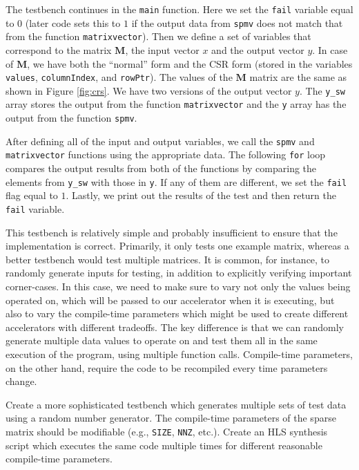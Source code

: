 The testbench continues in the \lstinline{main} function. Here we set the \lstinline{fail} variable equal to $0$ (later code sets this to $1$ if the output data from \lstinline{spmv} does not match that from the function \lstinline{matrixvector}). Then we define a set of variables that correspond to the matrix $\mathbf{M}$, the input vector $x$ and the output vector $y$. In case of $\mathbf{M}$, we have both the ``normal'' form and the CSR form (stored in the variables \lstinline{values}, \lstinline{columnIndex}, and \lstinline{rowPtr}). The values of the $\mathbf{M}$ matrix are the same as shown in Figure \ref{fig:crs}. We have two versions of the output vector $y$. The \lstinline{y_sw} array stores the output from the function \lstinline{matrixvector} and the \lstinline{y} array has the output from the function \lstinline{spmv}. 

After defining all of the input and output variables, we call the \lstinline{spmv} and \lstinline{matrixvector} functions using the appropriate data. The following \lstinline{for} loop compares the output results from both of the functions by comparing the elements from \lstinline{y_sw} with those in \lstinline{y}. If any of them are different, we set the \lstinline{fail} flag equal to $1$. Lastly, we print out the results of the test and then return the \lstinline{fail} variable. 

This testbench is relatively simple and probably insufficient to ensure that the implementation is correct.  Primarily, it only tests one example matrix, whereas a better testbench would test multiple matrices.  It is common, for instance, to randomly generate inputs for testing, in addition to explicitly verifying important corner-cases.   In this case, we need to make sure to vary not only the values being operated on, which will be passed to our accelerator when it is executing, but also to vary the compile-time parameters which might be used to create different accelerators with different tradeoffs.  The key difference is that we can randomly generate multiple data values to operate on and test them all in the same execution of the program, using multiple function calls.   Compile-time parameters, on the other hand, require the code to be recompiled every time parameters change.

\begin{exercise}
Create a more sophisticated testbench which generates multiple sets of test data using a random number generator. The compile-time parameters of the sparse matrix should be modifiable (e.g., \lstinline{SIZE}, \lstinline{NNZ}, etc.).  Create an HLS synthesis script which executes the same code multiple times for different reasonable compile-time parameters.
\end{exercise}

